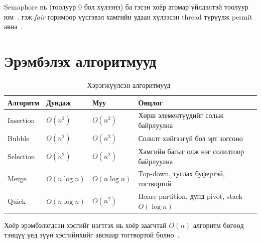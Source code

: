 Semaphore нь  (тоолуур 0 бол хүлээнэ) ба  гэсэн хоёр атомар үйлдэлтэй тоолуур юм~\cite[6.6]{osc10}.
 гэж \emph{fair} горимоор үүсгэвэл хамгийн удаан хүлээсэн thread түрүүлж permit авна~\cite{javadoc-semaphore}.

\section{Эрэмбэлэх алгоритмууд}
\begin{table}[H]
\centering\small
\caption{Хэрэгжүүлсэн алгоритмууд~\cite{clrs,hoare62}}\label{tab:algos}
\begin{tabularx}{\linewidth}{@{}lllY@{}}
\toprule
Алгоритм & Дундаж & Муу & Онцлог \\
\midrule
Insertion & $O(n^2)$ & $O(n^2)$ & Хөрш элементүүдийг сольж байрлуулна \\
Bubble & $O(n^2)$ & $O(n^2)$ & Солилт хийгээгүй бол эрт зогсоно \\
Selection & $O(n^2)$ & $O(n^2)$ & Хамгийн багыг олж нэг солилтоор байрлуулна \\
Merge & $O(n\log n)$ & $O(n\log n)$ & Top-down, туслах буфертэй, тогтвортой \\
Quick & $O(n\log n)$ & $O(n^2)$ & Hoare partition, дунд pivot, stack $O(\log n)$ \\
\bottomrule
\end{tabularx}
\end{table}
Хоёр эрэмбэлэгдсэн хэсгийг нэгтгэх нь хоёр заагчтай $O(n)$ алгоритм бөгөөд тэнцүү үед зүүн хэсгийнхийг авснаар
тогтвортой болно~\cite{clrs}.
